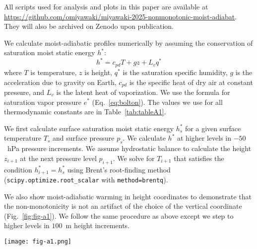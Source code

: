 \documentclass[]{ametsocV6.1}
\begin{document}
% 
%
\datastatement
All scripts used for analysis and plots in this paper are available at \url{https://github.com/omiyawaki/miyawaki-2025-nonmonotonic-moist-adiabat}. They will also be archived on Zenodo upon publication.



\appendix[A] 
\label{app:calculation}
We calculate moist-adiabatic profiles numerically by assuming the conservation of saturation moist static energy $h^*$:
\begin{equation}
h^*=c_{pd} T+gz+L_v q^* \label{eq:mse}
\end{equation}
where $T$ is temperature, $z$ is height, $q^*$ is the saturation specific humidity, $g$ is the acceleration due to gravity on Earth, $c_{pd}$ is the specific heat of dry air at constant pressure, and $L_v$ is the latent heat of vaporization. We use the \cite{bolton1980} formula for saturation vapor pressure $e^*$ (Eq.~\ref{eq:bolton}). The values we use for all thermodynamic constants are in Table~\ref{tab:tableA1}. 

We first calculate surface saturation moist static energy $h_s^*$ for a given surface temperature $T_s$ and surface pressure $p_s$. We calculate $h^*$ at higher levels in $-50$~hPa pressure increments. We assume hydrostatic balance to calculate the height $z_{i+1}$ at the next pressure level $p_{i+1}$. We solve for $T_{i+1}$ that satisfies the condition $h_{i+1}^*=h_s^*$ using Brent's root-finding method (\texttt{scipy.optimize.root\_scalar} with \texttt{method=brentq}).

We also show moist-adiabatic warming in height coordinates to demonstrate that the non-monotonicity is not an artifact of the choice of the vertical coordinate (Fig.~\ref{fig:fig-a1}). We follow the same procedure as above except we step to higher levels in $100$~m height increments.

\begin{figure*}[htbp]
 \centering
 \texttt{[image: fig-a1.png]}
 \caption{(a) Vertical profiles of moist-adiabatic warming to a 4~K surface warming for $T_s=$ 280, 290, 300, 310, and 320~K. Warming decreases with initial surface temperature at lower levels while it increases with initial surface temperature at higher levels. (b) moist-adiabatic warming varies non-monotonically with initial surface temperature at all levels, e.g. at 5~km, 10~km, 15~km, and 20~km. moist-adiabatic warming peaks at warmer initial surface temperatures at higher levels.}\label{fig:fig-a1}
\end{figure*}
\end{document}
